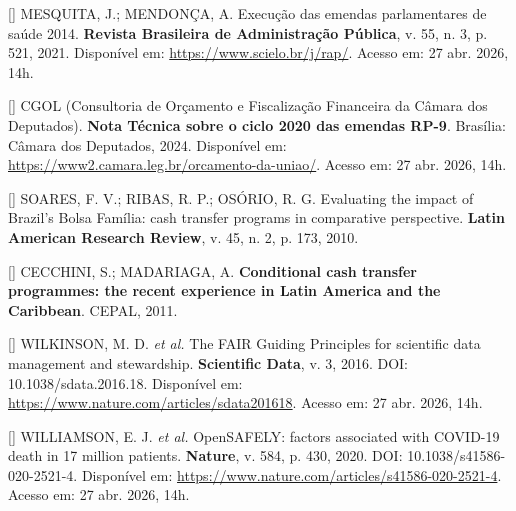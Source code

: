 \documentclass[12pt,a4paper,oneside]{article}
\begin{document}
\begin{singlespace}
\noindent\hangindent=1.25cm
[\thebibctr] MESQUITA, J.; MENDONÇA, A. Execução das emendas parlamentares de
saúde 2014. \textbf{Revista Brasileira de
Administração Pública}, v. 55, n. 3, p. 521, 2021.
Disponível em: \url{https://www.scielo.br/j/rap/}. Acesso em:
27 abr. 2026, 14h.\label{ref:mesquita}\par\smallskip

\noindent\hangindent=1.25cm
[\thebibctr] CGOL (Consultoria de Orçamento e Fiscalização Financeira da
Câmara dos Deputados). \textbf{Nota Técnica sobre o ciclo
2020 das emendas RP-9}. Brasília: Câmara dos
Deputados, 2024. Disponível em:
\url{https://www2.camara.leg.br/orcamento-da-uniao/}. Acesso em:
27 abr. 2026, 14h.\label{ref:cgol}\par\smallskip

\noindent\hangindent=1.25cm
[\thebibctr] SOARES, F. V.; RIBAS, R. P.; OSÓRIO, R. G. Evaluating the impact
of Brazil's Bolsa Família: cash transfer programs in comparative
perspective. \textbf{Latin American Research Review}, v. 45,
n. 2, p. 173, 2010.\label{ref:soares}\par\smallskip

\noindent\hangindent=1.25cm
[\thebibctr] CECCHINI, S.; MADARIAGA, A. \textbf{Conditional cash transfer
programmes: the recent experience in Latin America and the
Caribbean}. CEPAL, 2011.\label{ref:cecchini}\par\smallskip

\noindent\hangindent=1.25cm
[\thebibctr] WILKINSON, M. D. \textit{et al.} The FAIR Guiding Principles for
scientific data management and stewardship. \textbf{Scientific
Data}, v. 3, 2016. DOI: 10.1038/sdata.2016.18. Disponível em:
\url{https://www.nature.com/articles/sdata201618}. Acesso em:
27 abr. 2026, 14h.\label{ref:wilkinson}\par\smallskip

\noindent\hangindent=1.25cm
[\thebibctr] WILLIAMSON, E. J. \textit{et al.} OpenSAFELY: factors associated
with COVID-19 death in 17 million patients. \textbf{Nature},
v. 584, p. 430, 2020. DOI:
10.1038/s41586-020-2521-4. Disponível em:
\url{https://www.nature.com/articles/s41586-020-2521-4}. Acesso em:
27 abr. 2026, 14h.\label{ref:opensafely}\par\smallskip


\end{singlespace}
\end{document}
